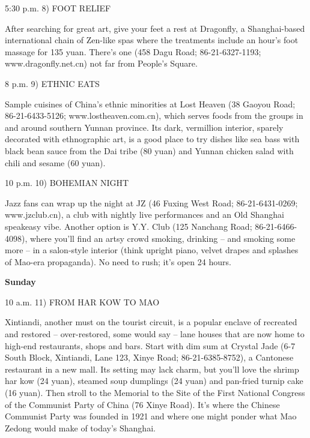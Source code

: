 \documentclass[12pt,a4paper,onecolumn]{article}
\begin{document}
\begin{CJK*}{GBK}{song}
\begin{description}
\item{5:30 p.m.} 8) FOOT RELIEF

After searching for great art, give your feet a rest at Dragonfly, a Shanghai-based international
chain of Zen-like spas where the treatments include an hour's foot massage for 135 yuan. There's one
(458 Dagu Road; 86-21-6327-1193; www.dragonfly.net.cn) not far from People's Square.

\item{8 p.m.} 9) ETHNIC EATS

Sample cuisines of China's ethnic minorities at Lost Heaven (38 Gaoyou Road; 86-21-6433-5126;
www.lostheaven.com.cn), which serves foods from the groups in and around southern Yunnan province.
Its dark, vermillion interior, sparely decorated with ethnographic art, is a good place to try
dishes like sea bass with black bean sauce from the Dai tribe (80 yuan) and Yunnan chicken salad
with chili and sesame (60 yuan).

\item{10 p.m.} 10) BOHEMIAN NIGHT

Jazz fans can wrap up the night at JZ (46 Fuxing West Road; 86-21-6431-0269; www.jzclub.cn), a club
with nightly live performances and an Old Shanghai speakeasy vibe. Another option is Y.Y. Club (125
Nanchang Road; 86-21-6466-4098), where you'll find an artsy crowd smoking, drinking -- and smoking
some more -- in a salon-style interior (think upright piano, velvet drapes and splashes of Mao-era
propaganda). No need to rush; it's open 24 hours.

\textbf{Sunday}

10 a.m. 11) FROM HAR KOW TO MAO

Xintiandi, another must on the tourist circuit, is a popular enclave of recreated and restored --
over-restored, some would say -- lane houses that are now home to high-end restaurants, shops and
bars. Start with dim sum at Crystal Jade (6-7 South Block, Xintiandi, Lane 123, Xinye Road;
86-21-6385-8752), a Cantonese restaurant in a new mall. Its setting may lack charm, but you'll love
the shrimp har kow (24 yuan), steamed soup dumplings (24 yuan) and pan-fried turnip cake (16 yuan).
Then stroll to the Memorial to the Site of the First National Congress of the Communist Party of
China (76 Xinye Road). It's where the Chinese Communist Party was founded in 1921 and where one
might ponder what Mao Zedong would make of today's Shanghai.

\end{description}


\end{CJK*}
\end{document}

